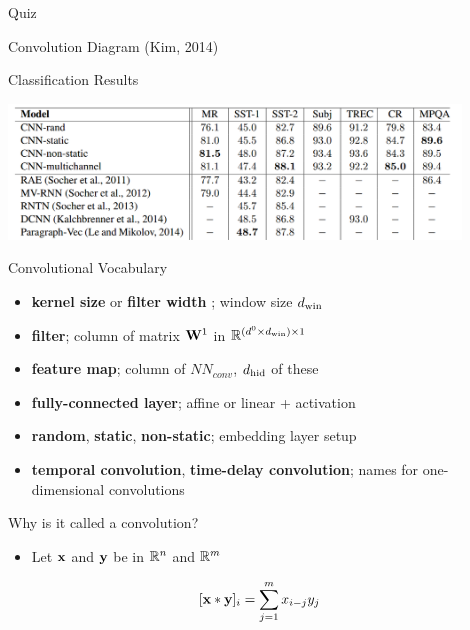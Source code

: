 \documentclass{beamer}
\begin{document}
\begin{frame}{Quiz}
\begin{itemize}
\begin{frame}{Convolution Diagram (Kim, 2014)}
\begin{itemize}
  \end{itemize}
\end{frame}

\begin{frame}{Classification Results}

  \begin{center}
    \includegraphics[width=12cm]{kimres}
  \end{center}
\end{frame}

\begin{frame}{Convolutional Vocabulary}
  \begin{itemize}
  \item \textbf{kernel size} or \textbf{filter width} ; window size ${d_{\mathrm{win}}}$
    \air 
  \item \textbf{filter}; column of matrix  $\mathbf{W}^1$ in $\mathbb{R}^{(d^0\times {d_{\mathrm{win}}})  \times 1}$  
    \air 

  \item \textbf{feature map}; column of $NN_{conv}$, ${d_{\mathrm{hid}}}$ of these 
    \air 

  \item \textbf{fully-connected layer}; affine or linear  + activation  
    \air 

  \item \textbf{random}, \textbf{static}, \textbf{non-static}; embedding layer setup
    \air
  \item \textbf{temporal convolution}, \textbf{time-delay convolution}; names for one-dimensional convolutions
  \end{itemize}
\end{frame}

\begin{frame}{Why is it called a convolution?}

  \begin{itemize}
  \item Let $\mathbf{x}$ and $\mathbf{y}$ be in $\mathbb{R}^n$ and $\mathbb{R}^m$ 
  \end{itemize}
  
  \[[\mathbf{x} \ast \mathbf{y}]_i = \sum_{j=1}^m   x_{i-j} y_j\]
  

\end{frame}
\end{itemize}
\end{frame}
\end{document}
